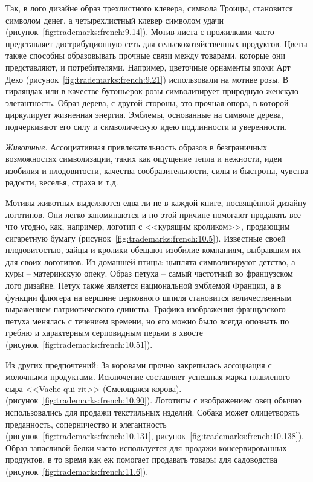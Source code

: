   Так, в лого дизайне образ трехлистного клевера, символа Троицы, становится
  символом денег, а четырехлистный клевер символом удачи
  (рисунок~\ref{fig:trademarks:french:9.14}). Мотив листа с прожилками часто
  представляет дистрибуционную сеть для сельскохозяйственных продуктов. Цветы
  также способны образовывать прочные связи между товарами, которые они
  представляют, и потребителями. Например, цветочные орнаменты эпохи Арт Деко
  (рисунок~\ref{fig:trademarks:french:9.21}) использовали на мотиве розы.  В
  гирляндах или в качестве бутоньерок розы символизирует природную женскую
  элегантность. Образ дерева, с другой стороны, это прочная опора, в которой
  циркулирует жизненная энергия. Эмблемы, основанные на символе дерева,
  подчеркивают его силу и символическую идею подлинности и уверенности.

\emph{Животные}. Ассоциативная привлекательность образов в безграничных
  возможностях символизации, таких как ощущение тепла и нежности, идеи изобилия и
  плодовитости, качества сообразительности, силы и быстроты, чувства радости,
  веселья, страха и т.д.

  Мотивы животных выделяются едва ли не в каждой книге, посвящённой дизайну
  логотипов. Они легко запоминаются и по этой причине помогают продавать все что
  угодно, как, например, логотип с <<курящим кроликом>>, продающим сигаретную бумагу
  (рисунок~\ref{fig:trademarks:french:10.5}). Известные своей плодовитостью, зайцы и
  кролики обещают изобилие компаниям, выбравшим их для своих логотипов.  Из
  домашней птицы: цыплята символизируют детство, а куры -- материнскую опеку.
  Образ петуха -- самый частотный во французском лого дизайне. Петух также
  является национальной эмблемой Франции, а в функции флюгера на вершине
  церковного шпиля становится величественным выражением патриотического
  единства. Графика изображения французского петуха менялась с течением времени,
  но его можно было всегда опознать по гребню и характерным серповидным перьям в
  хвосте (рисунок~\ref{fig:trademarks:french:10.51}).

  Из других предпочтений: За коровами прочно закрепилась ассоциация с молочными
  продуктами. Исключение составляет успешная марка плавленого сыра <<Vache qui
  rit>> (Смеющаяся корова). (рисунок~\ref{fig:trademarks:french:10.90}). Логотипы с
  изображением овец обычно использовались для продажи текстильных изделий. Собака
  может олицетворять преданность, соперничество и элегантность
  (рисунок~\ref{fig:trademarks:french:10.131},
  рисунок~\ref{fig:trademarks:french:10.138}).  Образ запасливой белки часто
  используется для продажи консервированных продуктов, в то время как еж помогает
  продавать товары для садоводства (рисунок~\ref{fig:trademarks:french:11.6}).

